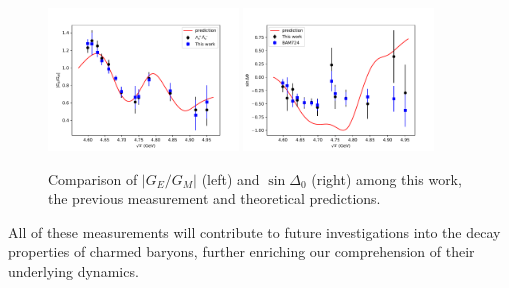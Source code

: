 \begin{figure}\centering
    \includegraphics[width=0.45\textwidth]{figure/summary/comp_GE_GM_ratio.pdf}
    \includegraphics[width=0.45\textwidth]{figure/summary/comp_sinDeltaPhi.pdf}
    \caption{Comparison of $|G_E/G_M|$ (left) and $\sin\Delta_0$ (right) among this work, the previous measurement and theoretical predictions.}
\label{fig:comp_theory}
\end{figure}

All of these measurements will contribute to future investigations into the decay properties of charmed baryons, further enriching our comprehension of their underlying dynamics.



